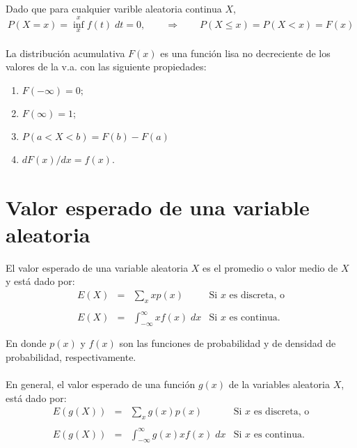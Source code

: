 Dado que para cualquier varible aleatoria continua $X$,
$$P(X=x) = \inf_x^x f(t)\; dt = 0, \qquad \Longrightarrow \qquad P(X\leq x) = P(X<x) = F(x)$$\\

La distribución acumulativa $F(x)$ es una función lisa no decreciente de los valores de la v.a. con las siguiente propiedades:
\begin{enumerate}[\bfseries 1.]
    \item $F(-\infty) = 0;$
    \item $F(\infty) = 1$;
    \item $P(a<X<b) = F(b) - F(a)$
    \item $dF(x)/dx = f(x).$
\end{enumerate}

\section{Valor esperado de una variable aleatoria}

\begin{tcolorbox}[colframe=white]
    \begin{def.}
	El valor esperado de una variable aleatoria $X$ es el promedio o valor medio de $X$ y está dado por:
	$$\begin{array}{rcll}
	    E(X)& = & \sum\limits_{x} xp(x) & \mbox{Si $x$ es discreta, o}\\\\
	    E(X) & = & \displaystyle\int_{-\infty}^\infty x f(x) \; dx & \mbox{Si $x$ es continua.}\\\\
	\end{array}$$
	En donde $p(x)$ y $f(x)$ son las funciones de probabilidad y de densidad de probabilidad, respectivamente.\\\\	
	En general, el valor esperado de una función $g(x)$ de la variables aleatoria $X$, está dado por:
	$$\begin{array}{rcll}
	    E(g(X))& = & \sum\limits_{x} g(x) p(x) & \mbox{Si $x$ es discreta, o}\\\\
	    E(g(X)) & = & \displaystyle\int_{-\infty}^\infty g(x)x f(x) \; dx & \mbox{Si $x$ es continua.}\\\\
	\end{array}$$
    \end{def.}
\end{tcolorbox}

